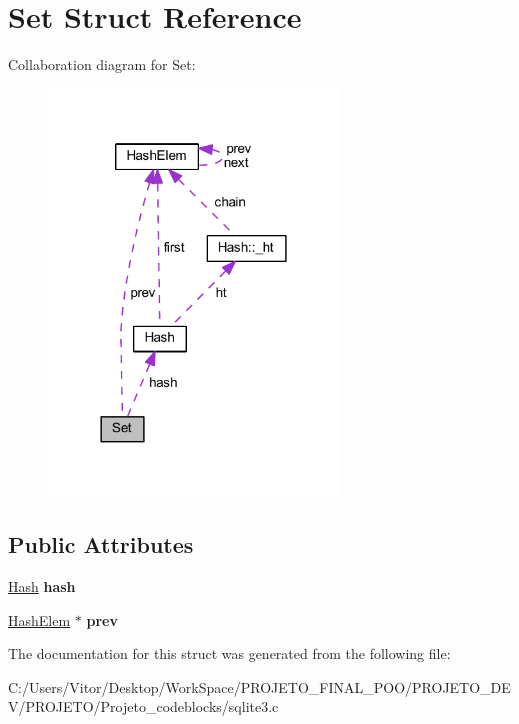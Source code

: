 \hypertarget{struct_set}{\section{Set Struct Reference}
\label{struct_set}
}


Collaboration diagram for Set\-:\nopagebreak
\begin{figure}[H]
\begin{center}
\leavevmode
\includegraphics[width=218pt]{struct_set__coll__graph}
\end{center}
\end{figure}
\subsection*{Public Attributes}
\begin{DoxyCompactItemize}
\item 
\hypertarget{struct_set_aeea736b00f6b4351bfe703722fffc6f9}{\hyperlink{struct_hash}{Hash} {\bfseries hash}}\label{struct_set_aeea736b00f6b4351bfe703722fffc6f9}

\item 
\hypertarget{struct_set_aebad2b96aa6e907b06ad5c3258879643}{\hyperlink{struct_hash_elem}{Hash\-Elem} $\ast$ {\bfseries prev}}\label{struct_set_aebad2b96aa6e907b06ad5c3258879643}

\end{DoxyCompactItemize}


The documentation for this struct was generated from the following file\-:\begin{DoxyCompactItemize}
\item 
C\-:/\-Users/\-Vitor/\-Desktop/\-Work\-Space/\-P\-R\-O\-J\-E\-T\-O\-\_\-\-F\-I\-N\-A\-L\-\_\-\-P\-O\-O/\-P\-R\-O\-J\-E\-T\-O\-\_\-\-D\-E\-V/\-P\-R\-O\-J\-E\-T\-O/\-Projeto\-\_\-codeblocks/sqlite3.\-c\end{DoxyCompactItemize}
